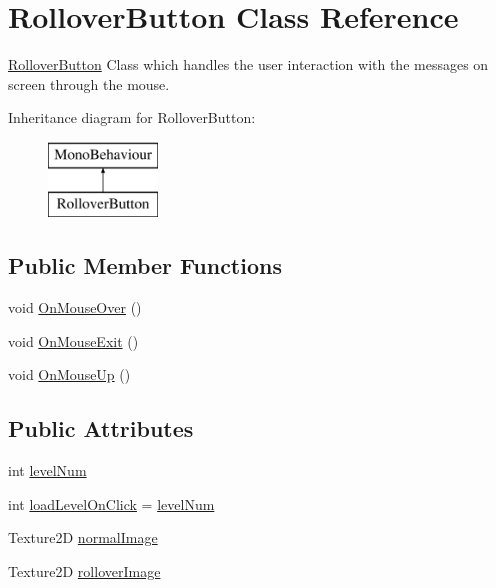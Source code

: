 \hypertarget{class_rollover_button}{\section{Rollover\-Button Class Reference}
\label{class_rollover_button}
}


\hyperlink{class_rollover_button}{Rollover\-Button} Class which handles the user interaction with the messages on screen through the mouse.  


Inheritance diagram for Rollover\-Button\-:\begin{figure}[H]
\begin{center}
\leavevmode
\includegraphics[height=2.000000cm]{class_rollover_button}
\end{center}
\end{figure}
\subsection*{Public Member Functions}
\begin{DoxyCompactItemize}
\item 
void \hyperlink{class_rollover_button_a8c6367bfcff578c8954362759b171e82}{On\-Mouse\-Over} ()
\item 
void \hyperlink{class_rollover_button_a2e732729d23aee09d5a7d2a66619978f}{On\-Mouse\-Exit} ()
\item 
void \hyperlink{class_rollover_button_ad187f96f20c1f4e817b88195db221c0c}{On\-Mouse\-Up} ()
\end{DoxyCompactItemize}
\subsection*{Public Attributes}
\begin{DoxyCompactItemize}
\item 
int \hyperlink{class_rollover_button_adc09dd1173a6259348be1d3525811f09}{level\-Num}
\item 
int \hyperlink{class_rollover_button_a3672f844e873bedbc308a4dcd1038e77}{load\-Level\-On\-Click} = \hyperlink{class_rollover_button_adc09dd1173a6259348be1d3525811f09}{level\-Num}
\item 
Texture2\-D \hyperlink{class_rollover_button_aa6ff64d2bb67d54b88494e63c3105dda}{normal\-Image}
\item 
Texture2\-D \hyperlink{class_rollover_button_a6cd6a9f837791f1d59bc12832612457e}{rollover\-Image}
\end{DoxyCompactItemize}


